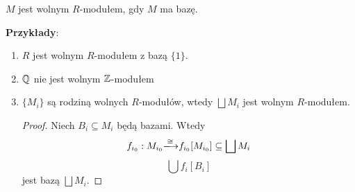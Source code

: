 \begin{definition}
$M$ jest wolnym $R$-modułem, gdy $M$ ma bazę.
\end{definition}

\textbf{Przykłady}:

\begin{enumerate}
    \item $R$ jest wolnym $R$-modułem z bazą $\{1\}$. 
    \item $\mathbb{Q}$ nie jest wolnym $\mathbb{Z}$-modułem
    \item $\{M_i\}$ są rodziną wolnych $R$-modułów, wtedy $\bigsqcup M_i$ jest wolnym $R$-modułem.

      \begin{proof}
        Niech $B_i\subseteq M_i$ będą bazami. Wtedy 
        $$f_{i_0}:M_{i_0}\isomorphism f_{i_0}[M_{i_0}]\subseteq\bigsqcup M_i$$
        $$\bigcup f_i[B_i]$$
        jest bazą $\bigsqcup M_i$.
      \end{proof}
\end{enumerate}

